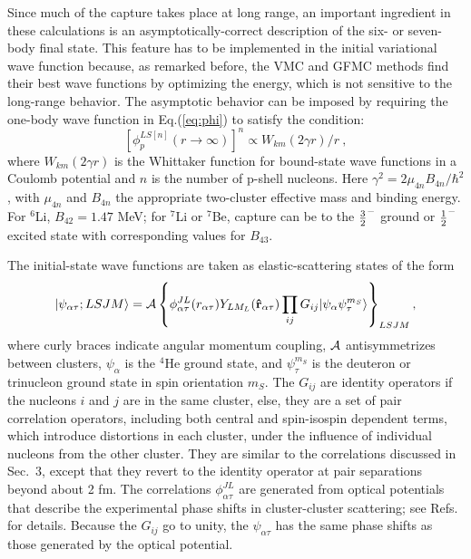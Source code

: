 Since much of the capture takes place at long range, an important ingredient 
in these calculations is an asymptotically-correct description of the six- 
or seven-body final state.
This feature has to be implemented in the initial variational wave function 
because, as remarked before, the VMC and GFMC methods find their best wave
functions by optimizing the energy, which is not sensitive to the long-range
behavior.
The asymptotic behavior can be imposed by requiring the one-body wave 
function in Eq.(\ref{eq:phi}) to satisfy the condition:
\begin{equation}
\label{eqn:asymptotic}
[\phi^{LS[n]}_{p}(r\rightarrow\infty)]^n \propto W_{km}(2\gamma r)/r \ ,
\end{equation}
where $W_{km}(2\gamma r)$ is the Whittaker function for bound-state wave
functions in a Coulomb potential and $n$ is the number of p-shell nucleons.
Here $\gamma^2 = 2\mu_{4n} B_{4n}/\hbar^2$, with $\mu_{4n}$ and $B_{4n}$
the appropriate two-cluster effective mass and binding energy.
For $^6$Li, $B_{42} = 1.47$ MeV; for $^7$Li or $^7$Be, capture
can be to the $\textstyle{3\over2}^-$ ground or $\textstyle{1\over2}^-$ 
excited state with corresponding values for $B_{43}$.

The initial-state wave functions are taken as elastic-scattering
states of the form
\begin{equation}
\label{eqn:scatstate}
|\psi_{\alpha\tau}; LSJM \rangle =
{\cal A}\left\{\phi_{\alpha\tau}^{JL}(r_{\alpha\tau})Y_{LM_L}({\bf\hat{r}}_{\alpha\tau})
\prod_{ij}G_{ij}|\psi_\alpha\psi_\tau^{m_S}\rangle\right\}_{LSJM},
\end{equation}
where curly braces indicate angular momentum coupling, $\cal{A}$
antisymmetrizes between clusters, $\psi_\alpha$ is the $^4$He ground
state, and $\psi_\tau^{m_S}$ is the deuteron or trinucleon ground state in 
spin orientation $m_S$.
The $G_{ij}$ are identity operators if the nucleons $i$ and $j$ are in
the same cluster, else, they are a set of pair correlation operators, including
both central and spin-isospin dependent terms, which introduce distortions in
each cluster, under the influence of individual nucleons from the
other cluster.  They are similar to the correlations discussed in Sec.~3,
except that they revert to the identity operator at pair separations beyond 
about 2 fm.
The correlations $\phi_{\alpha\tau}^{JL}$ are generated from optical
potentials that describe the experimental phase shifts in cluster-cluster 
scattering; see Refs.~\cite{NWS01,N01} for details.
Because the $G_{ij}$ go to unity, the $\psi_{\alpha\tau}$ has the same
phase shifts as those generated by the optical potential.


